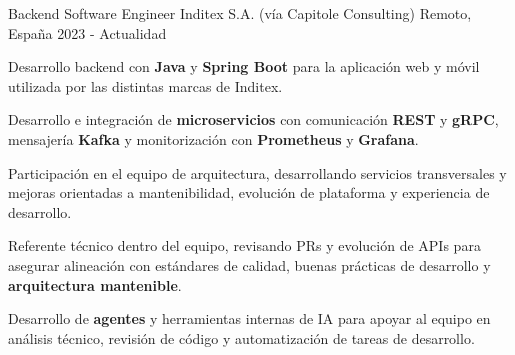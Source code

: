   \cventry
    {Backend Software Engineer}
    {Inditex S.A. \textnormal{(vía Capitole Consulting)}}
  {Remoto, España}
  {2023 - Actualidad}
  {
    \begin{cvitems}
      \item {Desarrollo backend con \textbf{Java} y \textbf{Spring Boot} para la aplicación web y móvil utilizada por las distintas marcas de Inditex.}
      \item {Desarrollo e integración de \textbf{microservicios} con comunicación \textbf{REST} y \textbf{gRPC}, mensajería \textbf{Kafka} y monitorización con \textbf{Prometheus} y \textbf{Grafana}.}
      \item {Participación en el equipo de arquitectura, desarrollando servicios transversales y mejoras orientadas a mantenibilidad, evolución de plataforma y experiencia de desarrollo.}
      \item {Referente técnico dentro del equipo, revisando PRs y evolución de APIs para asegurar alineación con estándares de calidad, buenas prácticas de desarrollo y \textbf{arquitectura mantenible}.}
      \item {Desarrollo de \textbf{agentes} y herramientas internas de IA para apoyar al equipo en análisis técnico, revisión de código y automatización de tareas de desarrollo.}
    \end{cvitems}
  }
